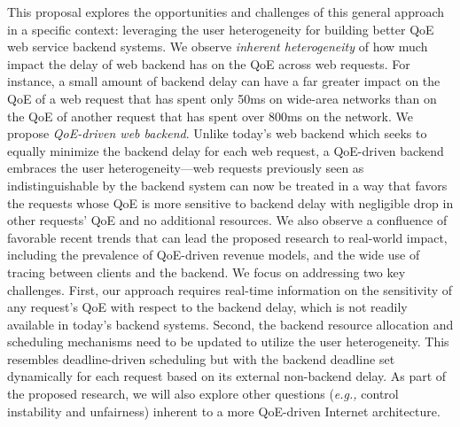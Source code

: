 \documentclass{proposalnsf}
\newcommand{\eg}{{\it e.g.,}\xspace}
\begin{document}
This proposal explores the opportunities and challenges of this general approach in a specific context: leveraging the user heterogeneity for building better QoE web service backend systems.
We observe {\em inherent heterogeneity} of how much impact the delay of web backend has on the QoE across web requests.
For instance, a small amount of backend delay can have a far greater impact on the QoE of a web request that has spent only 50ms on wide-area networks than on the QoE of another request that has spent over 800ms on the network.
We propose {\em QoE-driven web backend}.
Unlike today's web backend which seeks to equally minimize the backend delay for each web request, a QoE-driven backend embraces the user heterogeneity---web requests previously seen as indistinguishable by the backend system can now be treated in a way that favors the requests whose QoE is more sensitive to backend delay with negligible drop in other requests' QoE and no additional resources.
We also observe a confluence of favorable recent trends that can lead the proposed research to real-world impact, including the prevalence of QoE-driven revenue models, and the wide use of tracing between clients and the backend.
We focus on addressing two key challenges.
First, our approach requires real-time information on the sensitivity of any request's QoE with respect to the backend delay, which is not readily available in today's backend systems.
Second, the backend resource allocation and scheduling mechanisms need to be updated to utilize the user heterogeneity. This resembles deadline-driven scheduling but with the backend deadline set dynamically for each request based on its external non-backend delay.
As part of the proposed research, we will also explore other questions (\eg control instability and unfairness) inherent to a more QoE-driven Internet architecture.
\end{document}
